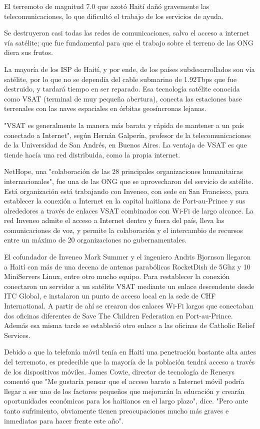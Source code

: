 \documentclass[twocolumn]{article}
\begin{document}
El terremoto de magnitud 7.0 que azotó Haití dañó gravemente las telecomunicaciones, lo que dificultó el trabajo de los servicios de ayuda.

Se destruyeron casi todas las redes de comunicaciones, salvo el acceso a internet vía satélite; que fue fundamental para que el trabajo sobre el terreno de las ONG diera sus frutos.

La mayoría de los ISP de Haití, y por ende, de los países subdesarrollados son vía satélite, por lo que no se dependía del cable submarino de 1.92Tbps que fue destruido, y tardará tiempo en ser reparado. Esa tecnología satélite conocida como VSAT (terminal de muy pequeña abertura), conecta las estaciones base terrenales con las naves espaciales en órbitas geosíncronas lejanas.

"VSAT es generalmente la manera más barata y rápida de mantener a un país conectado a Internet", según Hernán Galperín, profesor de la telecomunicaciones de la Universidad de San Andrés, en Buenos Aires. La ventaja de VSAT es que tiende hacía una red distribuida, como la propia internet.

NetHope, una "colaboración de las 28 principales organizaciones humanitairas internacionales", fue una de las ONG que se aprovecharon del servicio de satélite. Está organización está trabajando con Inveneo, con sede en San Francisco, para establecer la conexión a Internet en la capital haitiana de Port-au-Prince y sus alrededores a través de enlaces VSAT combinados con Wi-Fi de largo alcance. La red Inveneo admite el acceso a Internet dentro y fuera del país, lleva las comunicaciones de voz, y permite la colaboración y el intercambio de recursos entre un máximo de 20 organizaciones no gubernamentales.

El cofundador de Inveneo Mark Summer y el ingeniero Andris Bjornson llegaron a Haití con más de una decena de antenas parabólicas RocketDish de 5Ghz y 10 MiniServers Linux, entre otro mucho equipo. Para restablecer la conexión conectaron un servidor a un satélite VSAT mediante un enlace descendente desde ITC Global, e instalaron un punto de acceso local en la sede de CHF International. A partir de ahí se crearon dos enlaces Wi-Fi largos que conectaban dos oficinas diferentes de Save The Children Federation en Port-au-Prince. Además esa misma tarde se estableció otro enlace a las oficinas de Catholic Relief Services.

Debido a que la telefonía móvil tenía en Haití una penetración bastante alta antes del terremoto, es predecible que la mayoría de la población tendrá acceso a través de los dispositivos móviles. James Cowie, director de tecnología de Renesys comentó que "Me gustaría pensar que el acceso barato a Internet móvil podría llegar a ser uno de los factores pequeños que mejorarán la educación y crearán oportunidades económicas para los haitianos en el largo plazo", dice. "Pero ante tanto sufrimiento, obviamente tienen preocupaciones mucho más graves e inmediatas para hacer frente este año".
\end{document}
